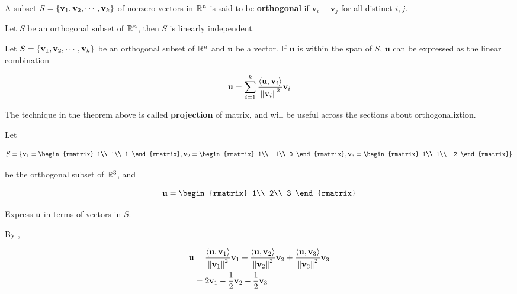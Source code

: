 \documentclass[a4paper,12pt]{article}
\begin{document}
\begin{dft}
  A subset $S=\left\{ \mathbf{v}_{1},\mathbf{v}_{2},\cdots,\mathbf{v}_{k}\right\}$ of nonzero vectors in $\mathbb{R}^{n}$ is said to be \textbf{orthogonal} if $\mathbf{v}_{i}\perp\mathbf{v}_{j}$ for all distinct $i,j$.
\end{dft}\n

\begin{thm}
  Let $S$ be an orthogonal subset of $\mathbb{R}^{n}$, then $S$ is linearly independent.
\end{thm}\n

\begin{thm}
  Let $S=\left\{ \mathbf{v}_{1},\mathbf{v}_{2},\cdots,\mathbf{v}_{k}\right\}$ be an orthogonal subset of $\mathbb{R}^{n}$ and $\mathbf{u}$ be a vector. If $\mathbf{u}$ is within the span of $S$, $\mathbf{u}$ can be expressed as the linear combination

  $$\mathbf{u}=\sum_{i=1}^{k}\frac{\left\langle \mathbf{u},\mathbf{v}_{i}\right\rangle}{\left\| \mathbf{v}_{i}\right\|^{2}}\mathbf{v}_{i}$$
\end{thm}\n

The technique in the theorem above is called \textbf{projection} of matrix, and will be useful across the sections about orthogonaliztion.\n

\begin{exm}
  Let

  $$S=\brc{\mathbf{v}_{1}=\begin{rmatrix}
    1\\
    1\\
    1
  \end{rmatrix},\mathbf{v}_{2}=\begin{rmatrix}
    1\\
    -1\\
    0
  \end{rmatrix},\mathbf{v}_{3}=\begin{rmatrix}
    1\\
    1\\
    -2
  \end{rmatrix}}$$\s

  be the orthogonal subset of $\mathbb{R}^{3}$, and

  $$\mathbf{u}=\begin{rmatrix}
    1\\
    2\\
    3
  \end{rmatrix}$$\s

  Express $\mathbf{u}$ in terms of vectors in $S$.\n

  \ans By \rthm[\sctd{1}],

  $$\begin{aligned}[t]
    \mathbf{u}&=\frac{\left\langle \mathbf{u},\mathbf{v}_{1}\right\rangle}{\left\| \mathbf{v}_{1}\right\|^{2}}\mathbf{v}_{1}+\frac{\left\langle \mathbf{u},\mathbf{v}_{2}\right\rangle}{\left\| \mathbf{v}_{2}\right\|^{2}}\mathbf{v}_{2}+\frac{\left\langle \mathbf{u},\mathbf{v}_{3}\right\rangle}{\left\| \mathbf{v}_{3}\right\|^{2}}\mathbf{v}_{3}\\
    &=2\mathbf{v}_{1}-\frac{1}{2}\mathbf{v}_{2}-\frac{1}{2}\mathbf{v}_{3}
  \end{aligned}$$
\end{exm}
\end{document}
